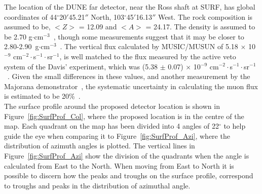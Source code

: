The location of the DUNE far detector, near the Ross shaft at SURF, has global coordinates of 44$^{\circ}$20$'$45.21$''$ North, 103$^{\circ}$45$'$16.13$''$ West. The rock composition is assumed to be, $< Z >$ = 12.09 and $< A >$ = 24.17. The density is assumed to be 2.70 g$\cdot$cm$^{-3}$~\citep{Mei:2009py}, though some measurements suggest that it may be closer to 2.80-2.90~g$\cdot$cm$^{-3}$~\citep{Gray:2010nc, Heise:2014gta}. The vertical flux calculated by MUSIC/MUSUN of 5.18 $\times$ 10$^{-9}$ cm$^{-2}\cdot$s$^{-1}\cdot$sr$^{-1}$, is well matched to the flux measured by the active veto system of the Davis' experiment, which was (5.38 $\pm$ 0.07) $\times$ 10$^{-9}$ cm$^{-2}\cdot$s$^{-1}\cdot$sr$^{-1}$~\citep{PhysRevD.27.1444}. Given the small differences in these values, and another measurement by the Majorana demonstrator~\citep{Abgrall:2016cfi}, the systematic uncertainty in calculating the muon flux is estimated to be 20\%~\citep{NDKTFNote}. \\

The surface profile around the proposed detector location is shown in Figure~\ref{fig:SurfProf_Col}, where the proposed location is in the centre of the map. Each quadrant on the map has been divided into 4 angles of 22$^{\circ}$ to help guide the eye when comparing it to Figure~\ref{fig:SurfProf_Azi}, where the distribution of azimuth angles is plotted. The vertical lines in Figure~\ref{fig:SurfProf_Azi} show the division of the quadrants when the angle is calculated from East to the North. When moving from East to North it is possible to discern how the peaks and troughs on the surface profile, correspond to troughs and peaks in the distribution of azimuthal angle. \\

